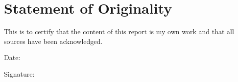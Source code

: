 \documentclass[a4paper, 11pt, listof=totoc, bibliography=totoc]{scrartcl}
\begin{document}
\newpage

\footnotesize
\tableofcontents
\normalsize

\newpage
\section*{Statement of Originality}

This is to certify that the content of this report is my own work and that all sources have been acknowledged.


Date:


Signature: 
\newpage







\newpage

\printbibliography
\end{document}
